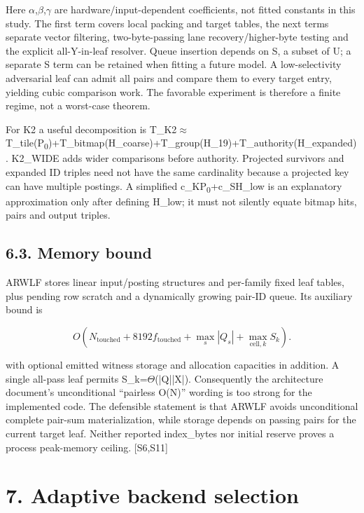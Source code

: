 \documentclass[10pt,letterpaper]{article}
\begin{document}
Here \ensuremath{\alpha},\ensuremath{\beta},\ensuremath{\gamma} are hardware/input-dependent coefficients, not fitted constants in this study. The first term covers local packing and target tables, the next terms separate vector filtering, two-byte-passing lane recovery/higher-byte testing and the explicit all-Y-in-leaf resolver. Queue insertion depends on S, a subset of U; a separate S term can be retained when fitting a future model. A low-selectivity adversarial leaf can admit all pairs and compare them to every target entry, yielding cubic comparison work. The favorable experiment is therefore a finite regime, not a worst-case theorem.


For K2 a useful decomposition is T\_K2\ensuremath{\approx}T\_tile(P\textsubscript{0})+T\_bitmap(H\_coarse)+T\_group(H\_19)+T\_authority(H\_expanded). K2\_WIDE adds wider comparisons before authority. Projected survivors and expanded ID triples need not have the same cardinality because a projected key can have multiple postings. A simplified c\_KP\textsubscript{0}+c\_SH\_low is an explanatory approximation only after defining H\_low; it must not silently equate bitmap hits, pairs and output triples.


\subsection*{6.3. Memory bound}

ARWLF stores linear input/posting structures and per-family fixed leaf tables, plus pending row scratch and a dynamically growing pair-ID queue. Its auxiliary bound is


\[
O\!\left(N_{\mathrm{touched}}+8192f_{\mathrm{touched}}+\max_s|Q_s|+\max_{\mathrm{cell},k}S_k\right).
\]

with optional emitted witness storage and allocation capacities in addition. A single all-pass leaf permits S\_k=\ensuremath{\Theta}(|Q||X|). Consequently the architecture document's unconditional ``pairless O(N)'' wording is too strong for the implemented code. The defensible statement is that ARWLF avoids unconditional complete pair-sum materialization, while storage depends on passing pairs for the current target leaf. Neither reported index\_bytes nor initial reserve proves a process peak-memory ceiling. [S6,S11]


\section*{7. Adaptive backend selection}
\end{document}
